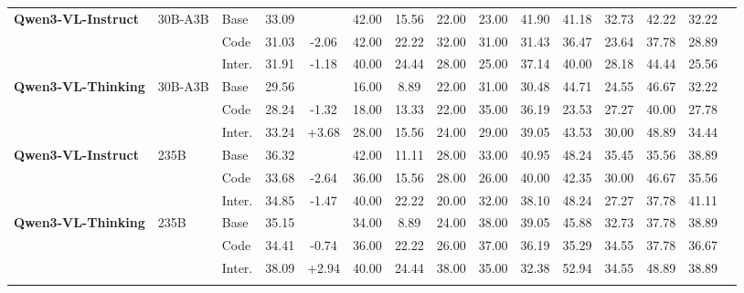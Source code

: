 \documentclass[runningheads]{llncs}
\begin{document}
\begin{table}[htbp]
{\begin{tabular}{lll c c cccccccccc}
    \addlinespace
    \textbf{Qwen3-VL-Instruct} & 30B-A3B & Base & 33.09 & & 42.00 & 15.56 & 22.00 & 23.00 & 41.90 & 41.18 & 32.73 & 42.22 & 32.22 \\
     & & Code & \cellcolor{bgLoss}31.03 & \cellcolor{bgLoss}-2.06 & 42.00 & 22.22 & 32.00 & 31.00 & 31.43 & 36.47 & 23.64 & 37.78 & 28.89 \\
     & & Inter. & \cellcolor{bgLoss}31.91 & \cellcolor{bgLoss}-1.18 & 40.00 & 24.44 & 28.00 & 25.00 & 37.14 & 40.00 & 28.18 & 44.44 & 25.56 \\
    \addlinespace
    \textbf{Qwen3-VL-Thinking} & 30B-A3B & Base & 29.56 & & 16.00 & 8.89 & 22.00 & 31.00 & 30.48 & 44.71 & 24.55 & 46.67 & 32.22 \\
    &  & Code & \cellcolor{bgLoss}28.24 & \cellcolor{bgLoss}-1.32 & 18.00 & 13.33 & 22.00 & 35.00 & 36.19 & 23.53 & 27.27 & 40.00 & 27.78 \\
    &  & Inter. & \cellcolor{bgGain}33.24 & \cellcolor{bgGain}+3.68 & \cellcolor{yellow!40}28.00 & 15.56 & 24.00 & 29.00 & 39.05 & 43.53 & 30.00 & 48.89 & \cellcolor{yellow!40}34.44 \\
    \addlinespace
    \textbf{Qwen3-VL-Instruct} & 235B & Base & 36.32 & & 42.00 & 11.11 & 28.00 & 33.00 & 40.95 & 48.24 & 35.45 & 35.56 & 38.89 \\
    &  & Code & \cellcolor{bgLoss}33.68 & \cellcolor{bgLoss}-2.64 & 36.00 & 15.56 & 28.00 & 26.00 & 40.00 & 42.35 & 30.00 & \cellcolor{yellow!40}46.67 & 35.56 \\
    &  & Inter. & \cellcolor{bgLoss}34.85 & \cellcolor{bgLoss}-1.47 & 40.00 & \cellcolor{yellow!40}22.22 & 20.00 & 32.00 & 38.10 & 48.24 & 27.27 & 37.78 & 41.11 \\
    \addlinespace
    \textbf{Qwen3-VL-Thinking} & 235B & Base & 35.15 & & 34.00 & 8.89 & 24.00 & 38.00 & 39.05 & 45.88 & 32.73 & 37.78 & 38.89 \\
    &  & Code & \cellcolor{bgLoss}34.41 & \cellcolor{bgLoss}-0.74 & 36.00 & \cellcolor{yellow!40}22.22 & 26.00 & 37.00 & 36.19 & 35.29 & 34.55 & 37.78 & 36.67 \\
    &  & Inter. & \cellcolor{bgGain}38.09 & \cellcolor{bgGain}+2.94 & 40.00 & \cellcolor{yellow!40}24.44 & \cellcolor{yellow!40}38.00 & 35.00 & 32.38 & 52.94 & 34.55 & \cellcolor{yellow!40}48.89 & 38.89 \\
    \addlinespace
    \bottomrule
  \end{tabular}
  }
\end{table}
\end{document}
